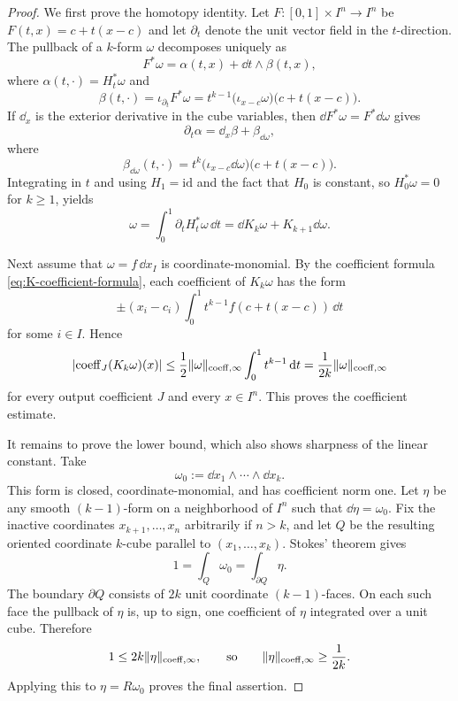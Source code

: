 \begin{proof}
We first prove the homotopy identity. Let $F:[0,1]\times I^n\to I^n$ be
$F(t,x)=c+t(x-c)$ and let $\partial_t$ denote the unit vector field in the
$t$-direction. The pullback of a $k$-form $\omega$ decomposes uniquely as
\[
F^\ast\omega=\alpha(t,x)+\dd t\wedge\beta(t,x),
\]
where $\alpha(t,\cdot)=H_t^\ast\omega$ and
\[
\beta(t,\cdot)=\iota_{\partial_t}F^\ast\omega
=t^{k-1}\bigl(\iota_{x-c}\omega\bigr)\bigl(c+t(x-c)\bigr).
\]
If $\dd_x$ is the exterior derivative in the cube variables, then
$\dd F^\ast\omega=F^\ast\dd\omega$ gives
\[
\partial_t\alpha=\dd_x\beta+\beta_{\dd\omega},
\]
where
\[
\beta_{\dd\omega}(t,\cdot)
=t^k\bigl(\iota_{x-c}\dd\omega\bigr)\bigl(c+t(x-c)\bigr).
\]
Integrating in $t$ and using $H_1=\mathrm{id}$ and the fact that
$H_0$ is constant, so $H_0^\ast\omega=0$ for $k\ge1$, yields
\[
\omega=\int_0^1\partial_t H_t^\ast\omega\,\dd t
=\dd K_k\omega+K_{k+1}\dd\omega .
\]

Next assume that $\omega=f\,\dd x_I$ is coordinate-monomial. By the
coefficient formula \eqref{eq:K-coefficient-formula}, each coefficient of
$K_k\omega$ has the form
\[
\pm (x_i-c_i)\int_0^1 t^{k-1}f(c+t(x-c))\,\dd t
\]
for some $i\in I$. Hence
\[
\lvert \mathrm{coeff}_J(K_k\omega)(x) \rvert
\le \frac12\lVert \omega \rVert_{\mathrm{coeff},\infty}\int_0^1t^{k-1}\,\mathrm{d} t
=\frac1{2k}\lVert \omega \rVert_{\mathrm{coeff},\infty}
\]
for every output coefficient $J$ and every $x\in I^n$. This proves the
coefficient estimate.

It remains to prove the lower bound, which also shows sharpness of the linear
constant. Take
\[
\omega_0:=\dd x_1\wedge\cdots\wedge\dd x_k.
\]
This form is closed, coordinate-monomial, and has coefficient norm one. Let $\eta$ be any
smooth $(k-1)$-form on a neighborhood of $I^n$ such that $\dd\eta=\omega_0$.
Fix the inactive coordinates $x_{k+1},\dots,x_n$ arbitrarily if $n>k$, and let
$Q$ be the resulting oriented coordinate $k$-cube parallel to
$(x_1,\dots,x_k)$. Stokes' theorem gives
\[
1=\int_Q\omega_0=\int_{\partial Q}\eta.
\]
The boundary $\partial Q$ consists of $2k$ unit coordinate $(k-1)$-faces. On
each such face the pullback of $\eta$ is, up to sign, one coefficient of
$\eta$ integrated over a unit cube. Therefore
\[
1\le 2k\lVert \eta \rVert_{\mathrm{coeff},\infty},
\qquad
\text{so}\qquad
\lVert \eta \rVert_{\mathrm{coeff},\infty}\ge\frac1{2k}.
\]
Applying this to $\eta=R\omega_0$ proves the final assertion.
\end{proof}

